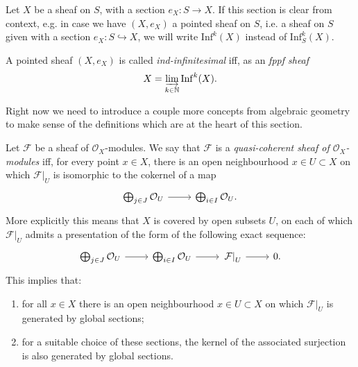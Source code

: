 \documentclass[../Main]{subfiles}
\begin{document}
\begin{defn}[]
	Let $X$ be a sheaf on $S$, with a section $e_X\colon S \to X$.
	If this section is clear from context, e.g. in case we have
	$(X, e_X)$ a pointed sheaf on $S$, i.e. a sheaf on $S$
	given with a section $e_X\colon S \hookrightarrow X$,
	we will write $\mathrm{Inf}^k(X)$
	instead of $\mathrm{Inf}_S^k(X)$.
\end{defn}


\begin{defn}
	A pointed sheaf $\left(X, e_X\right)$ is called {\em ind-infinitesimal} iff,
	as an {\em fppf sheaf}
	\begin{equation*}
		X = \varinjlim_{k \in \mathbb{N}} \mathrm{Inf}^k(X)
	.\end{equation*}
\end{defn}


Right now we need to introduce a couple more concepts from algebraic
geometry to make sense of the definitions which are at the heart of this section.
\begin{defn}
	Let $\mathcal{F}$ be a sheaf of $\mathcal{O}_{ X }$-modules.
	We say that $\mathcal{F}$ is a {\em quasi-coherent sheaf of $\mathcal{O}_{ X }$-modules}
	iff, for every point $x \in X$, there is an open neighbourhood $x \in U \subset X$
	on which $\left.\mathcal{F}\right|_{U}$ is isomorphic to the cokernel
	of a map
	\begin{equation*}
	\begin{tikzcd}[row sep = 0ex
		,/tikz/column 1/.append style={anchor=base east}
		,/tikz/column 2/.append style={anchor=base west}]
		\bigoplus_{j \in J} \mathcal{O}_{ U } \arrow[r, "", rightarrow] &
		\bigoplus_{i \in I} \mathcal{O}_{ U }
	.\end{tikzcd}
	\end{equation*}
	More explicitly this means that $X$ is covered by open subsets $U$,
	on each of which $\left.\mathcal{F}\right|_{U}$ admits a presentation
	of the form of the following exact sequence:
	\begin{equation*}
	\begin{tikzcd}[row sep = 0ex]
		\bigoplus_{j \in J} \mathcal{O}_{ U } \arrow[r, "", rightarrow] &
		\bigoplus_{i \in I} \mathcal{O}_{ U } \arrow[r, "", rightarrow] &
		\left.\mathcal{F}\right|_{U} \arrow[r, "", rightarrow] &
		0
	.\end{tikzcd}
	\end{equation*}
	This implies that:
	\begin{enumerate}
		\item for all $x \in X$ there is an open neighbourhood $x \in U \subset X$
			on which $\left.\mathcal{F}\right|_{U}$ is generated by global sections;

		\item for a suitable choice of these sections, the kernel of the associated surjection
			is also generated by global sections.
	\end{enumerate}
\end{defn}
\end{document}
